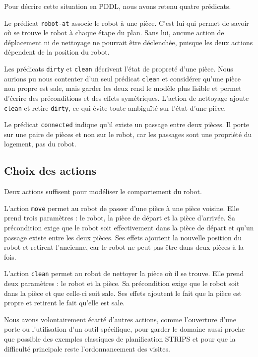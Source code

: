 \documentclass[a4paper, 11pt]{report}
\begin{document}
	Pour décrire cette situation en PDDL, nous avons retenu quatre prédicats.
	
	Le prédicat \texttt{robot-at} associe le robot à une pièce. C'est lui qui
	permet de savoir où se trouve le robot à chaque étape du plan. Sans lui,
	aucune action de déplacement ni de nettoyage ne pourrait être déclenchée,
	puisque les deux actions dépendent de la position du robot.
	
	Les prédicats \texttt{dirty} et \texttt{clean} décrivent l'état de propreté
	d'une pièce. Nous aurions pu nous contenter d'un seul prédicat \texttt{clean}
	et considérer qu'une pièce non propre est sale, mais garder les deux rend le
	modèle plus lisible et permet d'écrire des préconditions et des effets
	symétriques. L'action de nettoyage ajoute \texttt{clean} et retire
	\texttt{dirty}, ce qui évite toute ambiguïté sur l'état d'une pièce.
	
	Le prédicat \texttt{connected} indique qu'il existe un passage entre deux
	pièces. Il porte sur une paire de pièces et non sur le robot, car les
	passages sont une propriété du logement, pas du robot.
	
	\subsection{Choix des actions}
	
	Deux actions suffisent pour modéliser le comportement du robot.
	
	L'action \texttt{move} permet au robot de passer d'une pièce à une pièce
	voisine. Elle prend trois paramètres : le robot, la pièce de départ et la
	pièce d'arrivée. Sa précondition exige que le robot soit effectivement dans
	la pièce de départ et qu'un passage existe entre les deux pièces. Ses effets
	ajoutent la nouvelle position du robot et retirent l'ancienne, car le robot
	ne peut pas être dans deux pièces à la fois.
	
	L'action \texttt{clean} permet au robot de nettoyer la pièce où il se trouve.
	Elle prend deux paramètres : le robot et la pièce. Sa précondition exige que
	le robot soit dans la pièce et que celle-ci soit sale. Ses effets ajoutent
	le fait que la pièce est propre et retirent le fait qu'elle est sale.
	
	Nous avons volontairement écarté d'autres actions, comme l'ouverture d'une
	porte ou l'utilisation d'un outil spécifique, pour garder le domaine aussi
	proche que possible des exemples classiques de planification STRIPS et pour
	que la difficulté principale reste l'ordonnancement des visites.
	
\end{document}
